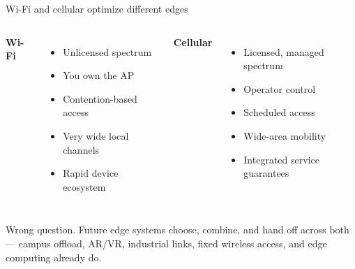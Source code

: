 \begin{frame}{Wi-Fi and cellular optimize different edges}
  \vspace{0.3em}
  \begin{columns}[T,onlytextwidth]
      {\large\textbf{\textcolor{ranblue}{Wi-Fi}}\par}
      \vspace{0.4em}
      \small
      \begin{itemize}\itemsep4pt
        \item Unlicensed spectrum
        \item You own the AP
        \item Contention-based access
        \item Very wide local channels
        \item Rapid device ecosystem
      \end{itemize}
      {\large\textbf{\textcolor{coreorange}{Cellular}}\par}
      \vspace{0.4em}
      \small
      \begin{itemize}\itemsep4pt
        \item Licensed, managed spectrum
        \item Operator control
        \item Scheduled access
        \item Wide-area mobility
        \item Integrated service guarantees
      \end{itemize}
  \end{columns}

  \vspace{0.7em}
     {Wrong question. Future edge systems choose, combine, and hand off
      across both --- campus offload, AR/VR, industrial links, fixed
      wireless access, and edge computing already do.}
\end{frame}

